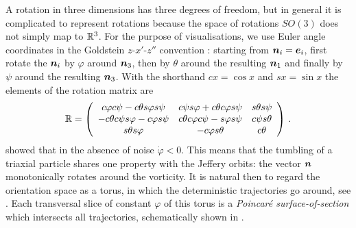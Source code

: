 \documentclass[thesis.tex]{subfiles}
\begin{document}
A rotation in three dimensions has three degrees of freedom, but in general it is complicated to represent rotations because the space of rotations $SO(3)$ does not simply map to $\mathbb{R}^3$.
For the purpose of visualisations, we use Euler angle coordinates in the Goldstein $z$-$x'$-$z''$ convention \cite{goldstein}: starting from $\mbox{\boldmath$n$}_i = \mbox{\boldmath$e$}_i$, first rotate the $\mbox{\boldmath$n$}_i$ by $\varphi$ around $\mbox{\boldmath$n$}_3$, then by $\theta$ around the resulting $\mbox{\boldmath$n$}_1$ and finally by $\psi$ around the resulting $\mbox{\boldmath$n$}_3$. With the shorthand $cx=\cos x$ and $sx=\sin x$ the elements of the rotation matrix are
\begin{align}
	\mathbb{R}=\left(
\begin{array}{ccc}
 c\varphi c\psi-c\theta s\varphi s\psi & c\psi s\varphi+c\theta c\varphi s\psi & s\theta s\psi \\
 -c\theta c\psi s\varphi-c\varphi s\psi & c\theta c\varphi c\psi-s\varphi s\psi & c\psi s\theta \\
 s\theta s\varphi & -c\varphi s\theta & c\theta \\
\end{array}
\right)\,.
\end{align}
\citet{hinch1979} showed that in the absence of noise $\dot \varphi < 0$. This means that the tumbling of a triaxial particle shares one property with the Jeffery orbits: the vector $\mbox{\boldmath$n$}$ monotonically rotates around the vorticity. It is natural then to regard the orientation space as a torus, in which the deterministic trajectories go around, see . Each transversal slice of constant $\varphi$ of this torus is a \emph{Poincar\'e surface-of-section} \cite{Strogatz} which intersects all trajectories, schematically shown in .
\end{document}
